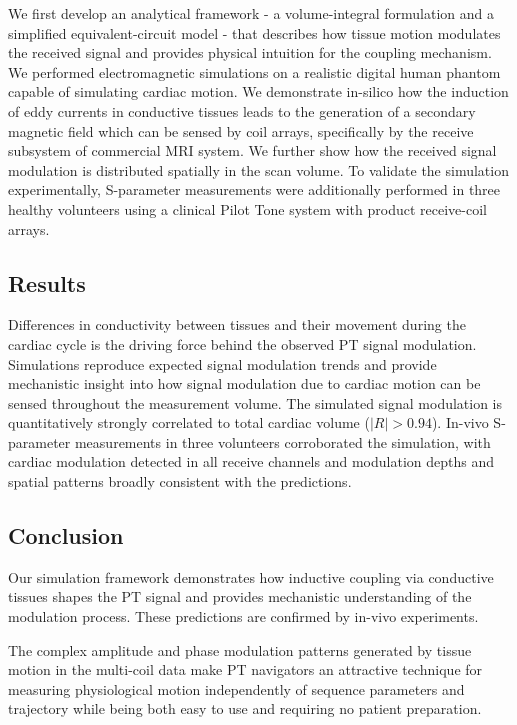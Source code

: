\documentclass[
]{article}
\begin{document}
We first develop an analytical framework - a volume-integral formulation and a simplified equivalent-circuit model - that describes how tissue motion modulates the received signal and provides physical intuition for the coupling mechanism. We performed electromagnetic simulations on a realistic digital human
phantom capable of simulating cardiac motion. We demonstrate in-silico
how the induction of eddy currents in conductive tissues leads to the
generation of a secondary magnetic field which can be sensed by coil
arrays, specifically by the receive subsystem of commercial MRI system.
We further show how the received signal modulation is distributed
spatially in the scan volume. To validate the simulation experimentally, S-parameter measurements were additionally performed in three healthy volunteers using a clinical Pilot Tone system with product receive-coil arrays.

\subsection{Results}\label{results}

Differences in conductivity between tissues and their movement during
the cardiac cycle is the driving force behind the observed PT signal
modulation. Simulations reproduce expected signal modulation trends and provide mechanistic insight into how signal modulation due to
cardiac motion can be sensed throughout the measurement volume. The
simulated signal modulation is quantitatively strongly correlated to total cardiac
volume ($|R| > 0.94$). In-vivo S-parameter measurements in three volunteers corroborated the simulation, with cardiac modulation detected in all receive channels and modulation depths and spatial patterns broadly consistent with the predictions.

\subsection{Conclusion}\label{conclusion}

Our simulation framework demonstrates how inductive coupling via
conductive tissues shapes the PT signal and provides mechanistic understanding of the modulation process. These predictions are confirmed by in-vivo experiments.

The complex amplitude and phase modulation patterns generated by tissue
motion in the multi-coil data make PT navigators an attractive
technique for measuring physiological motion independently of sequence
parameters and trajectory while being both easy to use and requiring no
patient preparation.
\end{document}
